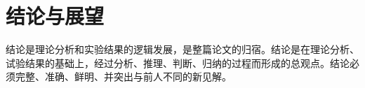 \section{结论与展望}
结论是理论分析和实验结果的逻辑发展，是整篇论文的归宿。结论是在理论分析、试验结果的基础上，经过分析、推理、判断、归纳的过程而形成的总观点。结论必须完整、准确、鲜明、并突出与前人不同的新见解。
